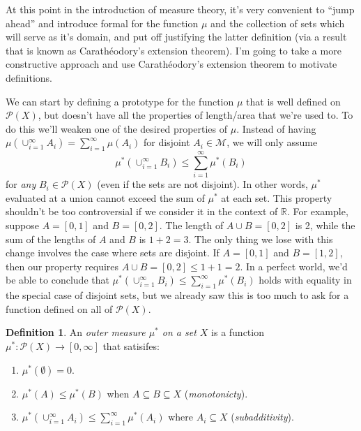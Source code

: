 \documentclass{article}
\newcommand{\R}{\mathbb{R}}
\theoremstyle{definition}
\newtheorem{definition}{Definition}[section]
\begin{document}
At this point in the introduction of measure theory, it's very convenient to ``jump ahead'' and introduce formal for the function $\mu$ and the collection of sets which will serve as it's domain, and put off justifying the latter definition (via a result that is known as Carathéodory's extension theorem). I'm going to take a more constructive approach and use Carathéodory's extension theorem to motivate definitions. 

We can start by defining a prototype for the function $\mu$ that is well defined on $\mathcal P(X)$, but doesn't have all the properties of length/area that we're used to.  To do this we'll weaken one of the desired properties of $\mu$. Instead of having  $\mu(\cup_{i=1}^\infty A_i) = \sum_{i=1}^{\infty}\mu(A_i)$ for disjoint $A_i\in \mathcal M$, we will only assume 
 $$ \mu^*(\cup_{i=1}^\infty B_i) \le \sum_{i=1}^{\infty}\mu^*(B_i)$$ for \textit{any} $B_i\in\mathcal P(X)$ (even if the sets are not disjoint). In other words, $\mu^*$ evaluated at a union cannot exceed the sum of $\mu^*$ at each set. This property shouldn't be too controversial if we consider it in the context of $\R$. For example, suppose $A = [0,1]$ and $B=[0,2]$. The length of $A\cup B = [0,2]$ is 2, while the sum of the lengths of $A$ and $B$ is $1+2=3$. The only thing we lose with this change involves the case where sets are disjoint. If $A = [0,1]$ and $B=[1,2]$, then our property requires $A\cup B =[0,2] \le 1 + 1 =2$. In a perfect world, we'd be able to conclude that $\mu^*(\cup_{i=1}^\infty B_i) \le \sum_{i=1}^{\infty}\mu^*(B_i)$ holds with equality in the special case of disjoint sets, but we already saw this is too much to ask for a function defined on all of $\mathcal P(X)$. 


\begin{definition}\label{def14.1}
	An \textit{\color{red}outer measure $\mu^*$ on a set $X$} is a function $\mu^*:\mathcal P(X)\to[0,\infty]$ that satisifes:
\begin{enumerate}
	\item $\mu^*(\emptyset) = 0$.
	\item $\mu^*(A)\le \mu^*(B)$ when $A\subseteq B\subseteq X$ (\textit{\color{red}monotonicty}).
	\item $\mu^*(\cup_{i=1}^\infty A_i) \le \sum_{i=1}^{\infty}\mu^*(A_i)$ where $A_i\subseteq X$ (\textit{\color{red}subadditivity}).
\end{enumerate}
\end{definition}
\end{document}
